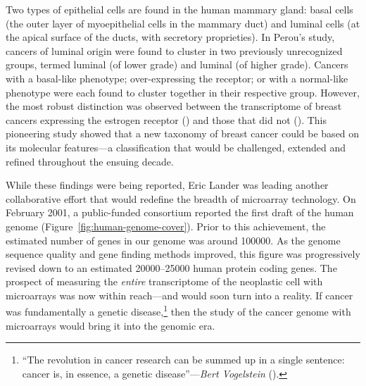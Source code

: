 Two types of epithelial cells are found in the human mammary gland: basal cells
(the outer layer of myoepithelial cells in the mammary duct) and luminal cells
(at the apical surface of the ducts, with secretory proprieties).  In Perou's
study, cancers of luminal origin were found to cluster in two previously
unrecognized groups, termed luminal  (of lower grade) and luminal
 (of higher grade).  Cancers with a \mbox{basal-like} phenotype;
\mbox{over-expressing} the  receptor; or with a normal-like
phenotype were each found to cluster together in their respective group.
However, the most robust distinction was observed between the transcriptome of
breast cancers expressing the estrogen receptor () and those that
did not ().  This pioneering study showed that a new taxonomy of
breast cancer could be based on its molecular features---a classification that
would be challenged, extended and refined throughout the ensuing
decade.\cite{sorlie_gene_2001,sorlie_repeated_2003,hu_molecular_2006,pusztai_molecular_2006,rakha_basal-like_2008,parker_supervised_2009,gusterson_basal-like_2009,weigelt_contribution_2010,prat_deconstructing_2011}


While these findings were being reported, Eric Lander was leading another
collaborative effort that would redefine the breadth of microarray technology.
On February 2001, a \mbox{public-funded} consortium reported the first draft of
the human genome (Figure~\ref{fig:human-genome-cover}).  Prior to this
achievement, the estimated number of genes in our genome was around
\num{100000}.\cite{cox_assessing_1994} As the genome sequence quality and gene
finding methods improved, this figure was progressively revised down to an
estimated \num{20000}--\num{25000} human protein coding genes.  The prospect of
measuring the \emph{entire} transcriptome of the neoplastic cell with
microarrays was now within reach---and would soon turn into a reality.  If
cancer was fundamentally a genetic disease,\footnote{``The revolution in cancer
  research can be summed up in a single sentence: cancer is, in essence, a
  genetic disease''---\emph{Bert Vogelstein}
  (\citealp{vogelstein_cancer_2004}).} then the study of the cancer genome with
microarrays would bring it into the genomic era.

